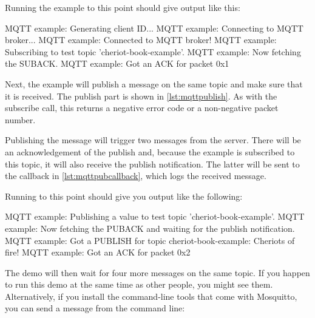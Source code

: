 \codelisting[filename=examples/mqtt/mqtt.cc,marker=ack_callback,label=lst:mqttackcallback,caption="Callback for acknowledging MQTT messages."]{}

Running the example to this point should give output like this:

\begin{console}
MQTT example: Generating client ID...
MQTT example: Connecting to MQTT broker...
MQTT example: Connected to MQTT broker!
MQTT example: Subscribing to test topic 'cheriot-book-example'.
MQTT example: Now fetching the SUBACK.
MQTT example: Got an ACK for packet 0x1
\end{console}

Next, the example will publish a message on the same topic and make sure that it is received.
The publish part is shown in \ref{lst:mqttpublish}.
As with the subscribe call, this returns a negative error code or a non-negative packet number.

\codelisting[filename=examples/mqtt/mqtt.cc,marker=publish,label=lst:mqttpublish,caption="Publishing to an MQTT topic."]{}

Publishing the message will trigger two messages from the server.
There will be an acknowledgement of the publish and, because the example is subscribed to this topic, it will also receive the publish notification.
The latter will be sent to the callback in \ref{lst:mqttpubcallback}, which logs the received message.

\codelisting[filename=examples/mqtt/mqtt.cc,marker=publish_callback,label=lst:mqttpubcallback,caption="Callback for receiving published MQTT messages."]{}

Running to this point should give you output like the following:

\begin{console}
MQTT example: Publishing a value to test topic 'cheriot-book-example'.
MQTT example: Now fetching the PUBACK and waiting for the publish notification.
MQTT example: Got a PUBLISH for topic cheriot-book-example: Cheriots of fire!
MQTT example: Got an ACK for packet 0x2
\end{console}

The demo will then wait for four more messages on the same topic.
If you happen to run this demo at the same time as other people, you might see them.
Alternatively, if you install the command-line tools that come with Mosquitto, you can send a message from the command line:

